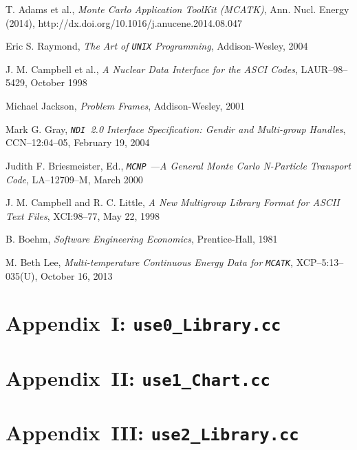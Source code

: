 \documentclass[12pt]{lamemo}
\newcommand{\NDI}{\texttt{NDI}}
\begin{document}
\newpage
\begin{thebibliography}{99}

 T. Adams et al., \emph{Monte Carlo Application
  ToolKit (MCATK)}, Ann. Nucl. Energy (2014),
  http://dx.doi.org/10.1016/j.anucene.2014.08.047

 Eric S. Raymond, \emph{The Art of \texttt{UNIX}
  Programming}, Addison-Wesley, 2004

 J. M. Campbell et al., \emph{A Nuclear Data
  Interface for the ASCI Codes}, LAUR--98--5429, October 1998

 Michael Jackson, \emph{Problem Frames},
  Addison-Wesley, 2001

 Mark G. Gray, \emph{\NDI\ 2.0 Interface
  Specification: Gendir and Multi-group Handles}, CCN--12:04--05,
    February 19, 2004

 Judith F. Briesmeister, Ed.,
  \emph{\texttt{MCNP} ---A General Monte Carlo N-Particle Transport
    Code}, LA--12709--M, March 2000 

 J. M. Campbell and R. C. Little, \emph{A New
  Multigroup Library Format for ASCII Text Files}, XCI:98--77, May 22,
  1998
 
 B. Boehm, \emph{Software Engineering Economics},
  Prentice-Hall, 1981 

 M. Beth Lee, \emph{Multi-temperature Continuous Energy
  Data for \texttt{MCATK}}, XCP--5:13--035(U), October 16, 2013

\end{thebibliography}

\footnotesize
\newpage
\section{Appendix~I: \texttt{use0\_Library.cc}}\label{app:use0}

\newpage
\section{Appendix~II: \texttt{use1\_Chart.cc}}\label{app:use1}

\newpage
\section{Appendix~III: \texttt{use2\_Library.cc}}\label{app:use2}

\end{document}
